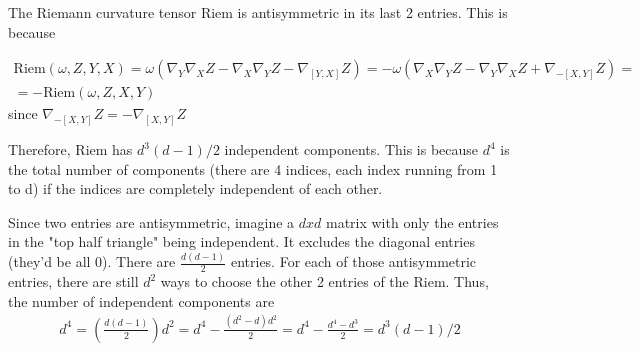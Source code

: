 The Riemann curvature tensor Riem is antisymmetric in its last 2 entries. This is because

\[
\begin{gathered}
	\text{Riem}(\omega, Z, Y, X) = \omega(\nabla_Y \nabla_X Z - \nabla_X \nabla_Y Z - \nabla_{[Y,X]} Z) = -\omega(\nabla_X \nabla_Y Z - \nabla_Y \nabla_X Z + \nabla_{-[X,Y]} Z ) = \\
	= -\text{Riem}(\omega, Z, X, Y)
\end{gathered}
\]
since $\nabla_{-[X,Y]}Z = -\nabla_{[X,Y]}Z$

Therefore, Riem has $d^3 (d-1)/2$ independent components. This is because $d^4$ is the total number of components (there are 4 indices, each index running from 1 to d) if the indices are completely independent of each other. 

Since two entries are antisymmetric, imagine a $dxd$ matrix with only the entries in the "top half triangle" being independent. It excludes the diagonal entries (they'd be all 0). There are $\frac{d(d-1)}{2}$ entries. For each of those antisymmetric entries, there are still $d^2$ ways to choose the other 2 entries of the Riem. Thus, the number of independent components are
\[
\begin{gathered}
	d^4 = \left( \frac{d(d-1)}{2} \right) d^2 = d^4 - \frac{ (d^2 - d)d^2}{2} = d^4 - \frac{d^4- d^3}{2} = d^3(d-1)/2
\end{gathered}
\]

